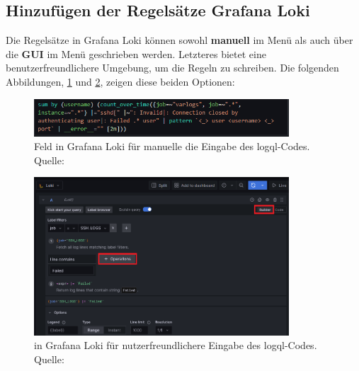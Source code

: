  

\newpage
\subsection{Hinzufügen der Regelsätze Grafana Loki}
Die Regelsätze in Grafana Loki können sowohl \textbf{manuell} im Menü  als auch über die \textbf{\gls{GUI}} im Menü  geschrieben werden. Letzteres bietet eine benutzerfreundlichere Umgebung, um die Regeln zu schreiben. Die folgenden Abbildungen, \ref{fig:Loki_Code} und \ref{fig:Loki_Builder}, zeigen diese beiden Optionen:

\begin{figure}[H]
   \centering
   \includegraphics[width=0.85\textwidth]{assets/manuellerCodeLoki.png}
   \caption[Feld in Grafana Loki für die manuelle die Eingabe des \gls{logql}-Codes]
   {Feld in Grafana Loki für manuelle die Eingabe des \gls{logql}-Codes. \\ Quelle: \citep{VoidQuark_sshlogs}}
   \label{fig:Loki_Code}
   \centering
\end{figure}

\begin{figure}[H]
   \centering
   \includegraphics[width=0.85\textwidth]{assets/klickibuntyGrafana.png}
   \caption[ in Grafana Loki für nutzerfreundlichere Eingabe des \gls{logql}-Codes.]
   { in Grafana Loki für nutzerfreundlichere Eingabe des \gls{logql}-Codes. Quelle: \citep{VoidQuark_sshlogs}}
   \label{fig:Loki_Builder}
   \centering
\end{figure}

